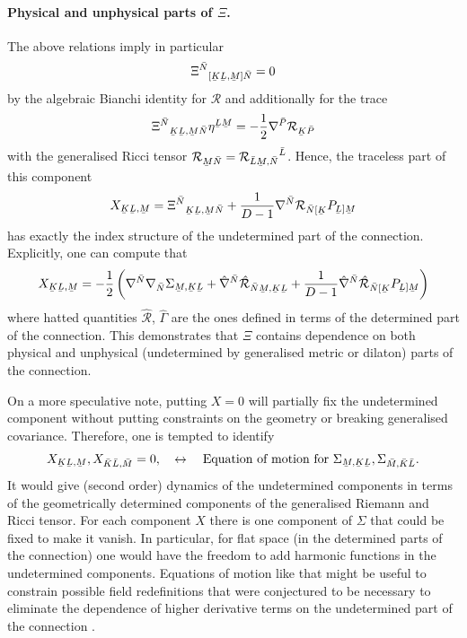 \documentclass[11pt,a4paper]{article}
\numberwithin{equation}{section}
\newcommand{\ubar}[1]{\underaccent{\bar}{#1}}
\newcommand{\bK}{\bar{K}}
\newcommand{\bL}{\bar{L}}
\newcommand{\bM}{\bar{M}}
\newcommand{\bN}{\bar{N}}
\newcommand{\bP}{\bar{P}}
\newcommand{\ubK}{\ubar{K}}
\newcommand{\ubL}{\ubar{L}}
\newcommand{\ubM}{\ubar{M}}
\begin{document}
\paragraph{Physical and unphysical parts of $\Xi$.} The above relations imply in particular
\begin{equation}
    {\Xi^{\bN}}_{[\ubK\ubL,\ubM]\bN}=0
\end{equation}
by the algebraic Bianchi identity for $\mathcal{R}$ and additionally for the trace
\begin{equation}
    {\Xi^{\bN}}_{\ubK\ubL,\ubM\bN} \eta^{\ubL\ubM} = - \frac{1}{2} \nabla^{\bP} \mathcal{R}_{\ubK \bP}
\end{equation}
with the generalised Ricci tensor $\mathcal{R}_{\ubM \bN} = {\mathcal{R}_{\bL\ubM , \bN}}^{\bL}$. Hence, the traceless part of this component
\begin{equation}
    X_{\ubK \ubL,\ubM} = {\Xi^{\bN}}_{\ubK\ubL,\ubM\bN} + \frac{1}{D-1} {\nabla^{\bN}} \mathcal{R}_{\bN [ \ubK} P_{\ubL] \ubM}
\end{equation}
has exactly the index structure of the undetermined part of the connection. Explicitly, one can compute that
\begin{equation}
    X_{\ubK \ubL,\ubM} = -\frac{1}{2} \left( \nabla^{\bN} \nabla_{\bN} \Sigma_{\ubM,\ubK \ubL} + \hat{\nabla}^{\bN} \hat{\mathcal{R}}_{\bN \ubM,\ubK \ubL} + \frac{1}{D-1} \hat{\nabla}^{\bN} \hat{\mathcal{R}}_{\bN [ \ubK} P_{\ubL] \ubM}\right)
\end{equation}
where hatted quantities $\hat{\mathcal{R}}$, $\hat{\Gamma}$ are the ones defined in terms of the determined part of the connection. This demonstrates that $\Xi$ contains dependence on both physical and unphysical (undetermined by generalised metric or dilaton) parts of the connection.

On a more speculative note, putting $X = 0$ will partially fix the undetermined component without putting constraints on the geometry or breaking generalised covariance. Therefore, one is tempted to identify
\begin{equation}
     X_{\ubK \ubL,\ubM}, X_{\bK \bL,\bM} = 0, \quad \leftrightarrow \quad \text{Equation of motion for $\Sigma_{\ubM,\ubK \ubL}, \Sigma_{\bM, \bK \bL}$.}
\end{equation}
It would give (second order) dynamics of the undetermined components in terms of the geometrically determined components of the generalised Riemann and Ricci tensor. For each component $X$ there is one component of $\Sigma$ that could be fixed to make it vanish. In particular, for flat space (in the determined parts of the connection) one would have the freedom to add harmonic functions in the undetermined components. Equations of motion like that might be useful to constrain possible field redefinitions that were conjectured to be necessary to eliminate the dependence of higher derivative terms on the undetermined part of the connection \cite{Hohm:2011si}.
\end{document}

